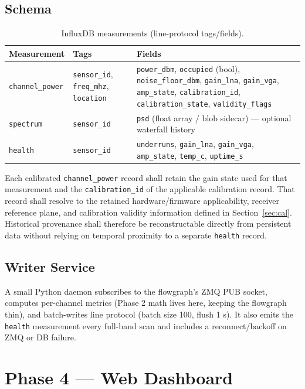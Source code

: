 \documentclass[12pt,a4paper]{report}
\begin{document}
 \subsection*{Schema}
 \begin{table}[htbp]
 	\centering
 	\caption{InfluxDB measurements (line-protocol tags/fields).}
 	\label{tab:dbschema}
 	\begin{tabular}{@{}llp{6.2cm}@{}}
 		\toprule
 		\textbf{Measurement} & \textbf{Tags} & \textbf{Fields} \\
 		\midrule
 		\texttt{channel\_power} & \texttt{sensor\_id}, \texttt{freq\_mhz},
 		\texttt{location} &
 		\texttt{power\_dbm}, \texttt{occupied} (bool), \texttt{noise\_floor\_dbm},
 		\texttt{gain\_lna}, \texttt{gain\_vga}, \texttt{amp\_state},
 		\texttt{calibration\_id}, \texttt{calibration\_state}, \texttt{validity\_flags} \\
 		\texttt{spectrum} & \texttt{sensor\_id} &
 		\texttt{psd} (float array / blob sidecar) --- optional waterfall history \\
 		\texttt{health} & \texttt{sensor\_id} &
 		\texttt{underruns}, \texttt{gain\_lna}, \texttt{gain\_vga}, \texttt{amp\_state},
 		\texttt{temp\_c}, \texttt{uptime\_s} \\
 		\bottomrule
 	\end{tabular}
 \end{table}
 Each calibrated \texttt{channel\_power} record shall retain the gain state used for that measurement and the \texttt{calibration\_id} of the applicable calibration record. That record shall resolve to the retained hardware/firmware applicability, receiver reference plane, and calibration validity information defined in Section~\ref{sec:cal}. Historical provenance shall therefore be reconstructable directly from persistent data without relying on temporal proximity to a separate \texttt{health} record.
 \subsection*{Writer Service}
 A small Python daemon subscribes to the flowgraph's ZMQ PUB socket, computes
 per-channel metrics (Phase 2 math lives here, keeping the flowgraph thin),
 and batch-writes line protocol (batch size 100, flush 1 s). It also emits the
 \texttt{health} measurement every full-band scan and includes a
 reconnect/backoff on ZMQ or DB failure.
 \section{Phase 4 --- Web Dashboard}
\end{document}
